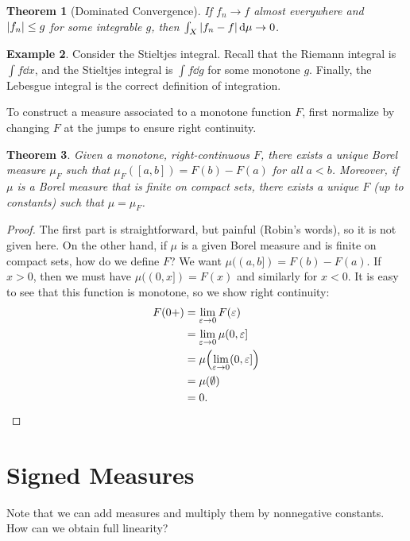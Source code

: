 \documentclass[leqno, openany]{memoir}
\newtheorem{thm}{Theorem}[chapter]
\theoremstyle{definition}
\newtheorem{exm}[thm]{Example}
\theoremstyle{remark}
\theoremstyle{plain}
\theoremstyle{definition}
\theoremstyle{remark}
\newcommand{\ep}{\varepsilon}
\begin{document}
\begin{thm}[Dominated Convergence]
    If $f_n \to f$ almost everywhere and $\abs{f_n} \leq g$ for some integrable $g$, then $\int_X \abs{f_n - f} \dd{\mu} \to 0$.
\end{thm}

\begin{exm}
    Consider the Stieltjes integral. Recall that the Riemann integral is $\int f \dd{x}$, and the Stieltjes integral is $\int f \dd{g}$ for some monotone $g$. Finally, the Lebesgue integral is the correct definition of integration.
\end{exm}

To construct a measure associated to a monotone function $F$, first normalize by changing $F$ at the jumps to ensure right continuity.

\begin{thm}
    Given a monotone, right-continuous $F$, there exists a unique Borel measure $\mu_F$ such that $\mu_F([a,b]) = F(b) - F(a)$ for all $a < b$. Moreover, if $\mu$ is a Borel measure that is finite on compact sets, there exists a unique $F$ (up to constants) such that $\mu = \mu_F$.
\end{thm}

\begin{proof}
    The first part is straightforward, but painful (Robin's words), so it is not given here. On the other hand, if $\mu$ is a given Borel measure and is finite on compact sets, how do we define $F$? We want $\mu((a,b]) = F(b) - F(a)$. If $x > 0$, then we must have $\mu((0,x]) = F(x)$ and similarly for $x < 0$. It is easy to see that this function is monotone, so we show right continuity:
    \begin{align*}
        F(0+) &= \lim_{\ep \to 0} F(\ep) \\
              &= \lim_{\ep \to 0} \mu (0,\ep] \\
              &= \mu \pqty{\lim_{\ep \to 0} (0, \ep] } \\
              &= \mu(\emptyset) \\
              &= 0.
    \end{align*}
\end{proof}

\section{Signed Measures}%
\label{sec:signed_measures}

Note that we can add measures and multiply them by nonnegative constants. How can we obtain full linearity?
\end{document}
